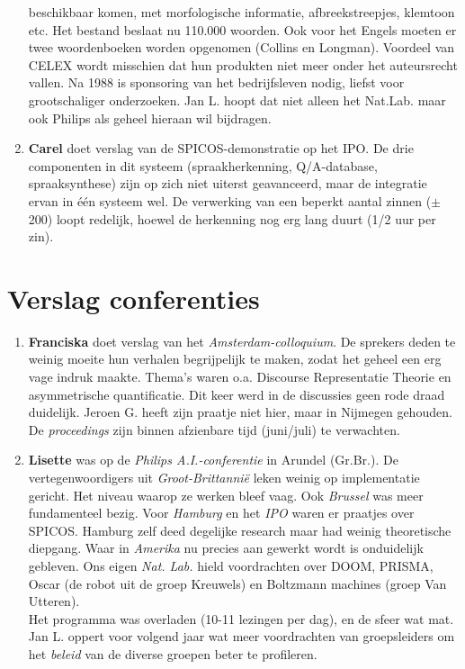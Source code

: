 \begin{enumerate}
beschikbaar komen, met morfologische informatie, afbreekstreepjes, klemtoon 
etc. Het bestand beslaat nu 110.000 woorden. Ook voor het Engels moeten er twee 
woordenboeken worden opgenomen (Collins en Longman). Voordeel van CELEX wordt 
misschien dat hun produkten niet meer onder het auteursrecht vallen.
Na 1988 is sponsoring van het bedrijfsleven nodig, liefst voor 
grootschaliger onderzoeken. Jan L. hoopt dat niet alleen het Nat.Lab. maar ook 
Philips als geheel hieraan wil bijdragen. 
  \item {\bf Carel} doet verslag van de SPICOS-demonstratie op het IPO. De drie 
componenten in dit systeem (spraakherkenning, Q/A-database, spraaksynthese) 
zijn op zich niet uiterst geavanceerd, maar de integratie ervan in \'{e}\'{e}n 
systeem wel. De verwerking van een beperkt aantal zinnen ($\pm$ 200) loopt 
redelijk, hoewel de herkenning nog erg lang duurt (1/2 uur per zin). 
\end{enumerate}
\section{Verslag conferenties}
\begin{enumerate}
\item {\bf Franciska} doet verslag van het {\em Amsterdam-colloquium}. De sprekers 
deden te weinig moeite hun verhalen begrijpelijk te maken, zodat het geheel een 
erg vage indruk maakte. Thema's waren o.a. Discourse Representatie Theorie en 
asymmetrische quantificatie. Dit keer werd in de discussies geen rode draad 
duidelijk. Jeroen G. heeft zijn praatje 
niet hier, maar in Nijmegen gehouden. De {\em proceedings} zijn binnen 
afzienbare tijd (juni/juli) te verwachten.
\item {\bf Lisette} was op de {\em Philips A.I.-conferentie} in Arundel (Gr.Br.).
De vertegenwoordigers uit {\em Groot-Brittanni\"{e}} leken weinig op 
implementatie gericht. Het niveau waarop ze 
werken bleef vaag. Ook {\em Brussel} was meer fundamenteel bezig.
Voor {\em Hamburg} en het {\em IPO} waren er praatjes over SPICOS. Hamburg zelf 
deed degelijke research
maar had weinig theoretische diepgang. Waar in {\em Amerika} nu precies 
aan gewerkt wordt is onduidelijk gebleven. Ons eigen {\em Nat. Lab.} hield 
voordrachten over DOOM, PRISMA, Oscar (de robot uit de groep Kreuwels) en 
Boltzmann machines (groep Van Utteren).\\
Het programma was overladen (10-11 lezingen per dag), en de sfeer wat mat. Jan 
L. oppert voor volgend jaar wat meer voordrachten van groepsleiders om het 
{\em beleid} van de diverse groepen beter te profileren.
\end{enumerate}

